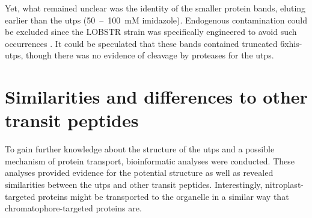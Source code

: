 Yet, what remained unclear was the identity of the smaller protein bands, eluting earlier than the \gls{utp}s (50~--~100~mM imidazole). Endogenous contamination could be excluded since the LOBSTR strain was specifically engineered to avoid such occurrences \parencite{andersen_optimized_2013}. It could be speculated that these bands contained truncated \gls{6xhis}-\gls{utp}s, though there was no evidence of cleavage by proteases for the \gls{utp}s. 
    
\section{Similarities and differences to other transit peptides}
To gain further knowledge about the structure of the \gls{utp}s and a possible mechanism of protein transport, bioinformatic analyses were conducted. These analyses provided evidence for the potential structure as well as revealed similarities between the \gls{utp}s and other transit peptides. Interestingly, nitroplast-targeted proteins might be transported to the organelle in a similar way that chromatophore-targeted proteins are.   

